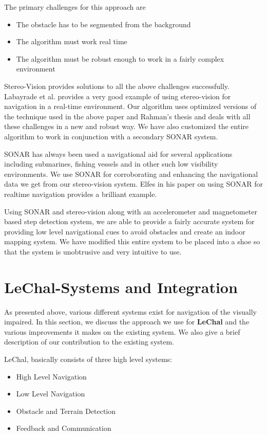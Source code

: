 \documentclass[11pt]{report}
\begin{document}
The primary challenges for this approach are
\begin{itemize}
	\item The obstacle has to be segmented from the background
	\item The algorithm must work real time
	\item The algorithm must be robust enough to work in a fairly complex environment
\end{itemize}

Stereo-Vision provides solutions to all the above challenges successfully. Labayrade et al.\cite{labayrade2002} provides a very good example of using stereo-vision for navigation in a real-time environment. Our algorithm uses optimized versions of the technique used in the above paper and Rahman's thesis\cite{obstacleavoidance} and  deals with all these challenges in a new and robust way. We have also customized the entire algorithm to work in conjunction with a secondary SONAR system. 

SONAR has always been used a navigational aid for several applications including submarines, fishing vessels and in other such low visibility environments. We use SONAR for corroborating and enhancing the navigational data we get from our stereo-vision system. Elfes\cite{sonar} in his paper on using SONAR for realtime navigation provides a brilliant example. 

Using SONAR and stereo-vision along with an accelerometer and magnetometer based step detection system, we are able to provide a fairly accurate system for providing low level navigational cues to avoid obstacles and create an indoor mapping system. We have modified this entire system to be placed into a shoe so that the system is unobtrusive and very intuitive to use.


\section{LeChal-Systems and Integration}

As presented above, various different systems exist for navigation of the visually impaired. In this section, we discuss the approach we use for \textbf{LeChal} and the various improvements it makes on the existing system. We also give a brief description of our contribution to the existing system.

LeChal, basically consists of three high level systems:
\label{subsystems}
\begin{itemize}
\item High Level Navigation
\item Low Level Navigation 
\item Obstacle and Terrain Detection
\item Feedback and Communication
\end{itemize}
\end{document}
